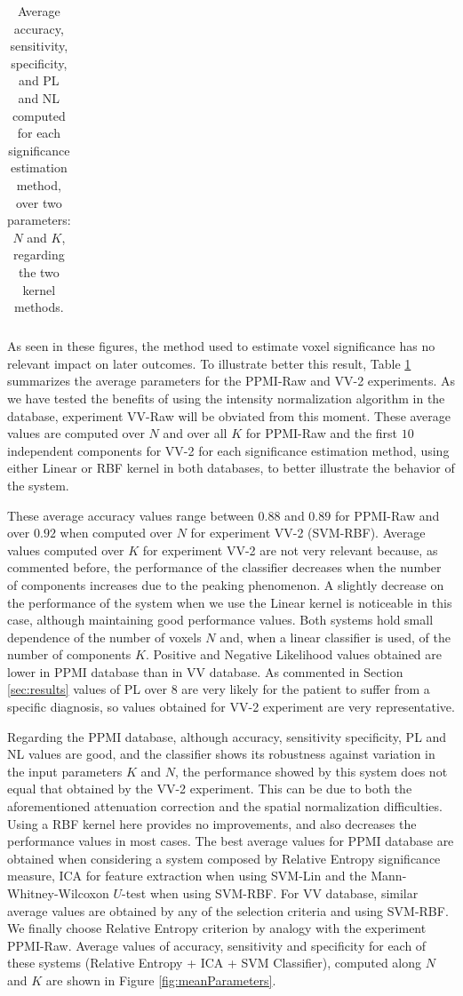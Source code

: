 \begin{table}[ht]
\begin{tabular}{lcccccccc}
			\hline\hline
		\end{tabular}
		\caption{Average accuracy, sensitivity, specificity, and PL and NL computed for each significance estimation method, over two parameters: $N$ and $K$, regarding the two kernel methods.  }
		\label{tab:meanValuesPPMIVV}
	\end{table}
	
	As seen in these figures, the method used to estimate voxel significance has no relevant impact on later outcomes. To illustrate better this result, Table \ref{tab:meanValuesPPMIVV} summarizes the average parameters for the PPMI-Raw and VV-2 experiments. As we have tested the benefits of using the intensity normalization algorithm in the database, experiment VV-Raw will be obviated from this moment. These average values are computed over $N$ and over all $K$ for PPMI-Raw and the first $10$ independent components for VV-2 for each significance estimation method, using either Linear or RBF kernel in both databases, to better illustrate the behavior of the system. 
	
	These average accuracy values range between $0.88$ and $0.89$ for PPMI-Raw and over $0.92$ when computed over $N$ for experiment VV-2 (SVM-RBF). Average values computed over $K$ for experiment VV-2 are not very relevant because, as commented before, the performance of the classifier decreases when the number of components increases due to the peaking phenomenon. A slightly decrease on the performance of the system when we use the Linear kernel is noticeable in this case, although maintaining good performance values. Both systems hold small dependence of the number of voxels $N$ and, when a linear classifier is used, of the number of components $K$. Positive and Negative Likelihood values obtained are lower in PPMI database than in VV database. As commented in Section \ref{sec:results} values of PL over 8 are very likely for the patient to suffer from a specific diagnosis, so values obtained for VV-2 experiment are very representative. 
	
	Regarding the PPMI database, although accuracy, sensitivity specificity, PL and NL values are good, and the classifier shows its robustness against variation in the input parameters $K$ and $N$, the performance showed by this system does not equal that obtained by the VV-2 experiment. This can be due to both the aforementioned attenuation correction and the spatial normalization difficulties. Using a RBF kernel here provides no improvements, and also decreases the performance values in most cases. The best average values for PPMI database are obtained when considering a system composed by Relative Entropy significance measure, ICA for feature extraction when using SVM-Lin and the Mann-Whitney-Wilcoxon $U$-test when using SVM-RBF. For VV database, similar average values are obtained by any of the selection criteria and using SVM-RBF. We finally choose Relative Entropy criterion by analogy with the experiment PPMI-Raw. Average values of accuracy, sensitivity and specificity for each of these systems (Relative Entropy + ICA + SVM Classifier), computed along $N$ and $K$ are shown in Figure \ref{fig:meanParameters}.
	
